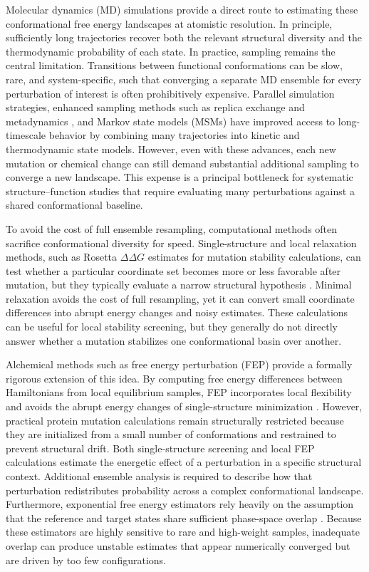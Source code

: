 \documentclass[journal=jctcce,manuscript=article,layout=twocolumn,hyperref=true]{achemso}
\begin{document}
	Molecular dynamics (MD) simulations provide a direct route to estimating these conformational free energy landscapes at atomistic resolution. In principle, sufficiently long trajectories recover both the relevant structural diversity and the thermodynamic probability of each state. In practice, sampling remains the central limitation. Transitions between functional conformations can be slow, rare, and system-specific, such that converging a separate MD ensemble for every perturbation of interest is often prohibitively expensive. Parallel simulation strategies, enhanced sampling methods such as replica exchange \cite{sugita1999replica} and metadynamics \cite{laio2002metadynamics}, and Markov state models (MSMs) \cite{chodera2014msm,husic2018msm} have improved access to long-timescale behavior by combining many trajectories into kinetic and thermodynamic state models. However, even with these advances, each new mutation or chemical change can still demand substantial additional sampling to converge a new landscape. This expense is a principal bottleneck for systematic structure--function studies that require evaluating many perturbations against a shared conformational baseline.

	To avoid the cost of full ensemble resampling, computational methods often sacrifice conformational diversity for speed. Single-structure and local relaxation methods, such as Rosetta $\Delta\Delta G$ estimates for mutation stability calculations, can test whether a particular coordinate set becomes more or less favorable after mutation, but they typically evaluate a narrow structural hypothesis \cite{kellogg2011rosetta}. Minimal relaxation avoids the cost of full resampling, yet it can convert small coordinate differences into abrupt energy changes and noisy estimates. These calculations can be useful for local stability screening, but they generally do not directly answer whether a mutation stabilizes one conformational basin over another.

	Alchemical methods such as free energy perturbation (FEP) provide a formally rigorous extension of this idea. By computing free energy differences between Hamiltonians from local equilibrium samples, FEP incorporates local flexibility and avoids the abrupt energy changes of single-structure minimization \cite{zwanzig1954fep,lu2001fepaccuracy,shirts2005comparison,pohorille2010freeenergy,shirts2008mbar,klimovich2015guidelines,he2018alchemical}. However, practical protein mutation calculations remain structurally restricted because they are initialized from a small number of conformations and restrained to prevent structural drift. Both single-structure screening and local FEP calculations estimate the energetic effect of a perturbation in a specific structural context. Additional ensemble analysis is required to describe how that perturbation redistributes probability across a complex conformational landscape. Furthermore, exponential free energy estimators rely heavily on the assumption that the reference and target states share sufficient phase-space overlap \cite{wu2005overlap1,wu2005overlap2}. Because these estimators are highly sensitive to rare and high-weight samples, inadequate overlap can produce unstable estimates that appear numerically converged but are driven by too few configurations.
\end{document}
